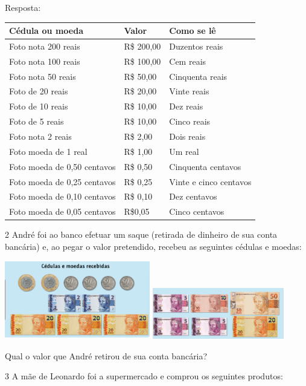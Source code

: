 Resposta:

\begin{longtable}[]{@{}lll@{}}
\toprule
Cédula ou moeda & Valor & Como se lê\tabularnewline
\midrule
\endhead
Foto nota 200 reais & R\$ 200,00 & Duzentos reais\tabularnewline
Foto nota 100 reais & R\$ 100,00 & Cem reais\tabularnewline
Foto nota 50 reais & R\$ 50,00 & Cinquenta reais\tabularnewline
Foto de 20 reais & R\$ 20,00 & Vinte reais\tabularnewline
Foto de 10 reais & R\$ 10,00 & Dez reais\tabularnewline
Foto de 5 reais & R\$ 10,00 & Cinco reais\tabularnewline
Foto nota 2 reais & R\$ 2,00 & Dois reais\tabularnewline
Foto moeda de 1 real & R\$ 1,00 & Um real\tabularnewline
Foto moeda de 0,50 centavos & R\$ 0,50 & Cinquenta
centavos\tabularnewline
Foto moeda de 0,25 centavos & R\$ 0,25 & Vinte e cinco
centavos\tabularnewline
Foto moeda de 0,10 centavos & R\$ 0,10 & Dez centavos\tabularnewline
Foto moeda de 0,05 centavos & R\$0,05 & Cinco centavos\tabularnewline
\bottomrule
\end{longtable}

\num{2} André foi ao banco efetuar um saque (retirada de dinheiro de sua conta
bancária) e, ao pegar o valor pretendido, recebeu as seguintes cédulas e moedas:


\includegraphics[width=2.50022in,height=1.34178in]{./media/image72.png}
\includegraphics[width=2.26686in,height=0.87508in]{./media/image73.png}

Qual o valor que André retirou de sua conta bancária?


\num{3} A mãe de Leonardo foi a supermercado e comprou os seguintes produtos:

